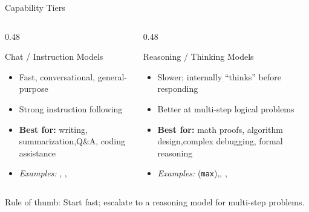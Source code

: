 \begin{frame}{Capability Tiers}
  \begin{columns}[T, onlytextwidth]
    \begin{column}{0.48\textwidth}
      \begin{block}{Chat / Instruction Models}
        \begin{itemize}
          \item Fast, conversational, general-purpose
          \item Strong instruction following
          \item \textbf{Best for:} writing, summarization,\newline Q\&A, coding assistance
          \item \textit{Examples:} , ,\newline {}
        \end{itemize}
      \end{block}
    \end{column}
    \hfill
    \begin{column}{0.48\textwidth}
      \begin{block}{Reasoning / Thinking Models}
        \begin{itemize}
          \item Slower; internally ``thinks'' before responding
          \item Better at multi-step logical problems
          \item \textbf{Best for:} math proofs, algorithm design,\newline complex debugging, formal reasoning
          \item \textit{Examples:}  (\texttt{max}),\newline {}, , 
        \end{itemize}
      \end{block}
    \end{column}
  \end{columns}
  \vspace{0.6em}
  \alert{Rule of thumb:} Start fast; escalate to a reasoning model for multi-step problems.
\end{frame}

